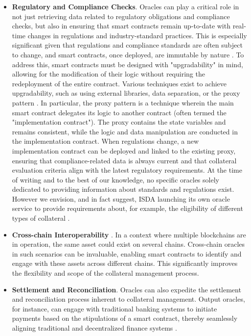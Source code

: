 \begin{itemize}
 
    \item \textbf{Regulatory and Compliance Checks}. Oracles can play a critical role in not just retrieving data related to regulatory obligations and compliance checks, but also in ensuring that smart contracts remain up-to-date with real-time changes in regulations and industry-standard practices. This is especially significant given that regulations and compliance standards are often subject to change, and smart contracts, once deployed, are immutable by nature \citep{zheng2020overview}. To address this, smart contracts must be designed with "upgradability" in mind, allowing for the modification of their logic without requiring the redeployment of the entire contract. Various techniques exist to achieve upgradability, such as using external libraries, data separation, or the proxy pattern \citep{meisami2023comprehensive}. In particular, the proxy pattern \citep{proxy_pattern} is a technique wherein the main smart contract delegates its logic to another contract (often termed the "implementation contract"). The proxy contains the state variables and remains consistent, while the logic and data manipulation are conducted in the implementation contract. When regulations change, a new implementation contract can be deployed and linked to the existing proxy, ensuring that compliance-related data is always current and that collateral evaluation criteria align with the latest regulatory requirements. At the time of writing and to the best of our knowledge, no specific  oracles solely dedicated to providing information about standards and regulations exist. However we envision, and in fact suggest, ISDA launching its own oracle service to provide requirements about, for example, the eligibility of different types of collateral \citep{cdm_website}. 
    
    \item \textbf{Cross-chain Interoperability} \citep{crosschain_oracles}. In a context where multiple blockchains are in operation, the same asset could exist on several chains. Cross-chain oracles in such scenarios can be invaluable, enabling smart contracts to identify and engage with these assets across different chains. This significantly improves the flexibility and scope of the collateral management process.
    
    \item \textbf{Settlement and Reconciliation}. Oracles can also expedite the settlement and reconciliation process inherent to collateral management. Output oracles, for instance, can engage with traditional banking systems to initiate payments based on the stipulations of a smart contract, thereby seamlessly aligning traditional and decentralized finance systems \citep{tradfi_defi_oracles}.
\end{itemize}